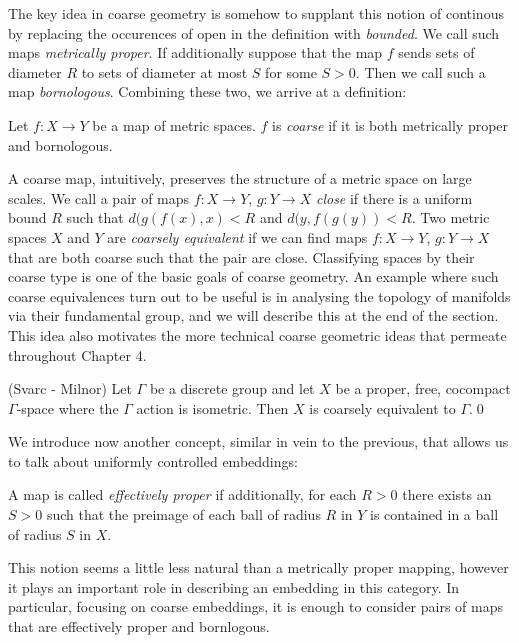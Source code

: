 The key idea in coarse geometry is somehow to supplant this notion of continous by replacing the occurences of open in the definition with \textit{bounded}. We call such maps \textit{metrically proper}. If additionally suppose that the map $f$ sends sets of diameter $R$ to sets of diameter at most $S$ for some $S>0$. Then we call such a map \textit{bornologous}. Combining these two, we arrive at a definition:

\begin{definition}
Let $f:X \rightarrow Y$ be a map of metric spaces. $f$ is \textit{coarse} if it is both metrically proper and bornologous.
\end{definition}

A coarse map, intuitively, preserves the structure of a metric space on large scales. We call a pair of maps $f:X\rightarrow Y$, $g:Y\rightarrow X$ \textit{close} if there is a uniform bound $R$ such that $d(g(f(x),x)<R$ and $d(y,f(g(y))<R$. Two metric spaces $X$ and $Y$ are \textit{coarsely equivalent} if we can find maps $f:X\rightarrow Y$, $g:Y\rightarrow X$ that are both coarse such that the pair are close.  Classifying spaces by their coarse type is one of the basic goals of coarse geometry. An example where such coarse equivalences turn out to be useful is in analysing the topology of manifolds via their fundamental group, and we will describe this at the end of the section. This idea also motivates the more technical coarse geometric ideas that permeate throughout Chapter 4.

\begin{lemma}(Svarc - Milnor)
Let $\Gamma$ be a discrete group and let $X$ be a proper, free, cocompact $\Gamma$-space where the $\Gamma$ action is isometric. Then $X$ is coarsely equivalent to $\Gamma$.\qed
\end{lemma}

We introduce now another concept, similar in vein to the previous, that allows us to talk about uniformly controlled embeddings:

\begin{definition}
A map is called \textit{effectively proper} if additionally, for each $R>0$ there exists an $S>0$ such that the preimage of each ball of radius $R$ in $Y$ is contained in a ball of radius $S$ in $X$.
\end{definition}

This notion seems a little less natural than a metrically proper mapping, however it plays an important role in describing an embedding in this category. In particular, focusing on coarse embeddings, it is enough to consider pairs of maps that are effectively proper and bornlogous.

